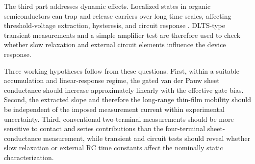 The third part addresses dynamic effects. Localized states in organic
semiconductors can trap and release carriers over long time scales, affecting
threshold-voltage extraction, hysteresis, and circuit response
\cite{Hirwa2015TrapStates,Bobbert2012OperationalStability}. DLTS-type transient
measurements and a simple amplifier test are therefore used to check whether
slow relaxation and external circuit elements influence the device response.

Three working hypotheses follow from these questions. First, within a suitable
accumulation and linear-response regime, the gated van der Pauw sheet
conductance should increase approximately linearly with the effective gate bias.
Second, the extracted slope and therefore the long-range thin-film mobility
should be independent of the imposed measurement current within experimental
uncertainty. Third, conventional two-terminal measurements should be more
sensitive to contact and series contributions than the four-terminal
sheet-conductance measurement, while transient and circuit tests should reveal
whether slow relaxation or external RC time constants affect the nominally
static characterization.